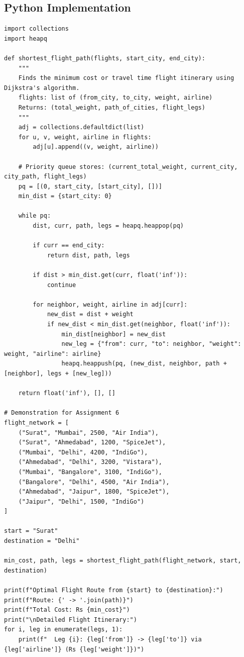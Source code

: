 \documentclass[12pt]{article}
\begin{document}
\subsection*{Python Implementation}
\begin{lstlisting}[style=code]
import collections
import heapq

def shortest_flight_path(flights, start_city, end_city):
    """
    Finds the minimum cost or travel time flight itinerary using Dijkstra's algorithm.
    flights: list of (from_city, to_city, weight, airline)
    Returns: (total_weight, path_of_cities, flight_legs)
    """
    adj = collections.defaultdict(list)
    for u, v, weight, airline in flights:
        adj[u].append((v, weight, airline))

    # Priority queue stores: (current_total_weight, current_city, city_path, flight_legs)
    pq = [(0, start_city, [start_city], [])]
    min_dist = {start_city: 0}

    while pq:
        dist, curr, path, legs = heapq.heappop(pq)

        if curr == end_city:
            return dist, path, legs

        if dist > min_dist.get(curr, float('inf')):
            continue

        for neighbor, weight, airline in adj[curr]:
            new_dist = dist + weight
            if new_dist < min_dist.get(neighbor, float('inf')):
                min_dist[neighbor] = new_dist
                new_leg = {"from": curr, "to": neighbor, "weight": weight, "airline": airline}
                heapq.heappush(pq, (new_dist, neighbor, path + [neighbor], legs + [new_leg]))

    return float('inf'), [], []

# Demonstration for Assignment 6
flight_network = [
    ("Surat", "Mumbai", 2500, "Air India"),
    ("Surat", "Ahmedabad", 1200, "SpiceJet"),
    ("Mumbai", "Delhi", 4200, "IndiGo"),
    ("Ahmedabad", "Delhi", 3200, "Vistara"),
    ("Mumbai", "Bangalore", 3100, "IndiGo"),
    ("Bangalore", "Delhi", 4500, "Air India"),
    ("Ahmedabad", "Jaipur", 1800, "SpiceJet"),
    ("Jaipur", "Delhi", 1500, "IndiGo")
]

start = "Surat"
destination = "Delhi"

min_cost, path, legs = shortest_flight_path(flight_network, start, destination)

print(f"Optimal Flight Route from {start} to {destination}:")
print(f"Route: {' -> '.join(path)}")
print(f"Total Cost: Rs {min_cost}")
print("\nDetailed Flight Itinerary:")
for i, leg in enumerate(legs, 1):
    print(f"  Leg {i}: {leg['from']} -> {leg['to']} via {leg['airline']} (Rs {leg['weight']})")
\end{lstlisting}
\end{document}
